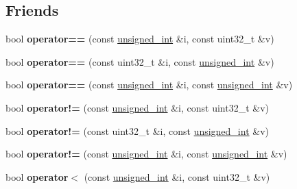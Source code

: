 \subsection*{Friends}
\begin{DoxyCompactItemize}
\item 
\mbox{\label{structfc_1_1unsigned__int_a08687d9bd50d9dec64808a19580f2a47}} 
bool {\bfseries operator==} (const \mbox{\hyperlink{structfc_1_1unsigned__int}{unsigned\+\_\+int}} \&i, const uint32\+\_\+t \&v)
\item 
\mbox{\label{structfc_1_1unsigned__int_a8c6aae02c0e6500d98d56544b4c49da0}} 
bool {\bfseries operator==} (const uint32\+\_\+t \&i, const \mbox{\hyperlink{structfc_1_1unsigned__int}{unsigned\+\_\+int}} \&v)
\item 
\mbox{\label{structfc_1_1unsigned__int_add87b4023be256deec5ac1afe4faf17c}} 
bool {\bfseries operator==} (const \mbox{\hyperlink{structfc_1_1unsigned__int}{unsigned\+\_\+int}} \&i, const \mbox{\hyperlink{structfc_1_1unsigned__int}{unsigned\+\_\+int}} \&v)
\item 
\mbox{\label{structfc_1_1unsigned__int_a53410718318d48dd4e6279103b351663}} 
bool {\bfseries operator!=} (const \mbox{\hyperlink{structfc_1_1unsigned__int}{unsigned\+\_\+int}} \&i, const uint32\+\_\+t \&v)
\item 
\mbox{\label{structfc_1_1unsigned__int_a1f618b0b2975a066c658435fb7eca0f9}} 
bool {\bfseries operator!=} (const uint32\+\_\+t \&i, const \mbox{\hyperlink{structfc_1_1unsigned__int}{unsigned\+\_\+int}} \&v)
\item 
\mbox{\label{structfc_1_1unsigned__int_a897385977d9c06e539a1c19dbdffb5ec}} 
bool {\bfseries operator!=} (const \mbox{\hyperlink{structfc_1_1unsigned__int}{unsigned\+\_\+int}} \&i, const \mbox{\hyperlink{structfc_1_1unsigned__int}{unsigned\+\_\+int}} \&v)
\item 
\mbox{\label{structfc_1_1unsigned__int_a1ff316df3fa8ffdc0886d48e4d50e7f2}} 
bool {\bfseries operator$<$} (const \mbox{\hyperlink{structfc_1_1unsigned__int}{unsigned\+\_\+int}} \&i, const uint32\+\_\+t \&v)

\end{DoxyCompactItemize}
